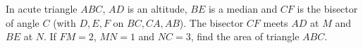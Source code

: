 In acute triangle $ABC$, $AD$ is an altitude, $BE$ is a median and $CF$ is the bisector of angle $C$ (with $D,E,F$ on $BC,CA,AB$). The bisector $CF$ meets $AD$ at $M$ and $BE$ at $N$. If $FM=2$, $MN=1$ and $NC=3$, find the area of triangle $ABC$.

